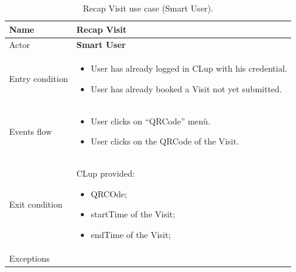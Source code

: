 \begin{table}[H]\begin{tabular}{|p{5cm} | p{7cm} | }
	\hline
	Name & \textbf{Recap Visit} \\
	\hline
	Actor & \textbf{Smart User} \\
	\hline
	Entry condition &
    \begin{itemize}
	    \item User has already logged in CLup with his credential. 
		\item User has already booked a Visit not yet submitted.
        \end{itemize}\\
	\hline
	Events flow & \begin{itemize}
	\item User clicks on “QRCode” menù.
    \item User clicks on the QRCode of the Visit.
    \end{itemize}\\
	\hline
	Exit condition & CLup provided:
    \begin{itemize}
    \item QRCOde;
    \item startTime of the Visit;
    \item endTime of the Visit;
    \end{itemize}\\
	\hline 
	Exceptions & \\
	\hline
\end{tabular}
\caption{Recap Visit use case (Smart User).}
\end{table}

\bigbreak

